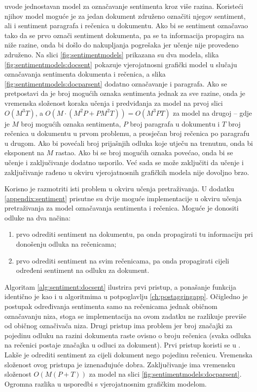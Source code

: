 \citet{mcdonald2007structured} uvode jednostavan model za označavanje sentimenta
kroz više razina. Koristeći njihov model moguće je za jedan dokument združeno
označiti njegov sentiment, ali i sentiment paragrafa i rečenica u dokumentu. Ako
bi se sentiment označavao tako da se prvo označi sentiment dokumenta, pa se ta
informacija propagira na niže razine, onda bi došlo do nakupljanja pogrešaka jer
učenje nije provedeno združeno. Na slici \ref{fig:sentimentmodels} prikazana su
dva modela, slika \ref{fig:sentimentmodels:docsent} pokazuje vjerojatnosni
grafički model u slučaju označavanja sentimenta dokumenta i rečenica, a slika
\ref{fig:sentimentmodels:docparsent} dodatno označavanje i paragrafa. Ako se
pretpostavi da je broj mogućih oznaka sentimenta jednak za sve razine, onda je
vremenska složenost koraka učenja i predviđanja za model na prvoj slici $O(M^3
T)$, a $O(M\cdot(M^2 P + P M^2 T))=O(M^3 P T)$ za model na drugoj -- gdje je $M$
broj mogućih oznaka sentimenta, $P$ broj paragrafa u dokumentu i $T$ broj
rečenica u dokumentu u prvom problemu, a prosječan broj rečenica po paragrafu u
drugom. Ako bi povećali broj prijašnjih odluka koje utječu na trenutnu,
onda bi eksponent na $M$ rastao. Ako bi se broj mogućih oznaka povećao, onda bi
se učenje i zaključivanje dodatno usporilo. Već sada se može zaključiti da
učenje i zaključivanje rađeno u okviru vjerojatnosnih grafičkih modela nije
dovoljno brzo.

Korisno je razmotriti isti problem u okviru učenja pretraživanja. U dodatku
\ref{appendix:sentiment} prisutne su dvije moguće implementacije u okviru učenja
pretraživanja za model označavanja sentimenta i rečenica. Moguće je donositi
odluke na dva načina:
\begin{enumerate}
  \item prvo odrediti sentiment na dokumentu, pa onda propagirati tu informaciju
  pri donošenju odluka na rečenicama;
  \item prvo odrediti sentiment na svim rečenicama, pa onda propagirati cijeli
  određeni sentiment na odluku za dokument.
\end{enumerate}
Algoritam \ref{alg:sentiment:docsent} ilustrira prvi pristup, a ponašanje
funkcija identično je kao i u algoritmima u potpoglavlju \ref{ch:postaggingapp}.
Očigledno je postupak određivanja sentimenta samo na rečenicama jednak običnom
označavanju niza, stoga se implementacija na ovom zadatku ne razlikuje previše
od običnog označivača niza. Drugi pristup ima problem jer broj značajki za
pojedinu odluku na razini dokumenta raste ovisno o broju rečenica (svaka odluka
na rečenici postaje značajka u odluci za dokument). Prvi pristup koristi se u
\citep{mcdonald2007structured}. Lakše je odrediti sentiment za cijeli dokument
nego pojedinu rečenicu. Vremenska složenost ovog pristupa je iznenađujuće dobra.
Zaključivanje ima vremensku složenost $O(M (P + T))$ za model na slici
\ref{fig:sentimentmodels:docparsent}. Ogromna razlika u usporedbi s
vjerojatnosnim grafičkim modelom.

